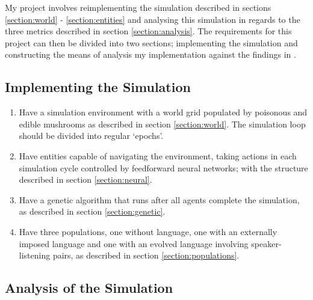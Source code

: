 \documentclass[12pt,a4paper,twoside,openright]{report}
\begin{document}
My project involves reimplementing the simulation described in sections \ref{section:world} - \ref{section:entities} and analysing this simulation in regards to the three metrics described in section \ref{section:analysis}. The requirements for this project can then be divided into two sections; implementing the simulation and constructing the means of analysis my implementation against the findings in \citet{Cangelosi1998}.

\subsection*{Implementing the Simulation}

\begin{enumerate}

\item Have a simulation environment with a world grid populated by poisonous and edible mushrooms as described in section \ref{section:world}. The simulation loop should be divided into regular `epochs'.

\item Have entities capable of navigating the environment, taking actions in each simulation cycle controlled by feedforward neural networks; with the structure described in section \ref{section:neural}.

\item Have a genetic algorithm that runs after all agents complete the simulation, as described in section \ref{section:genetic}.

\item Have three populations, one without language, one with an externally imposed language and one with an evolved language involving speaker-listening pairs, as described in section \ref{section:populations}.

\end{enumerate}

\subsection*{Analysis of the Simulation}
\end{document}

